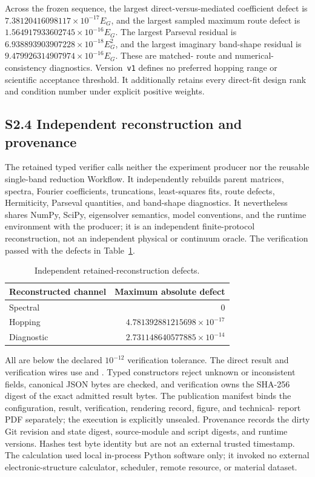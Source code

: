 Across the frozen sequence, the largest direct-versus-mediated coefficient
defect is $7.38120416098117\times10^{-17}E_G$, and the largest sampled maximum
route defect is $1.564917933602745\times10^{-16}E_G$. The largest Parseval
residual is $6.938893903907228\times10^{-18}E_G^2$, and the largest imaginary
band-shape residual is $9.479926314907974\times10^{-16}E_G$. These are matched-
route and numerical-consistency diagnostics. Version~\texttt{v1} defines no preferred
hopping range or scientific acceptance threshold. It additionally retains every
direct-fit design rank and condition number under explicit positive weights.

\subsection*{S2.4 Independent reconstruction and provenance}

The retained typed verifier calls neither the experiment producer nor the reusable
single-band reduction Workflow. It independently rebuilds
parent matrices, spectra, Fourier coefficients, truncations, least-squares
fits, route defects, Hermiticity, Parseval quantities, and band-shape
diagnostics. It nevertheless shares NumPy, SciPy, eigensolver semantics,
model conventions, and the runtime environment with the producer; it is an
independent finite-protocol reconstruction, not an independent physical or
continuum oracle. The verification passed with the defects in
Table~\ref{tab:supp-m1-verification}.

\begin{table}[ht]
\centering
\caption{Independent retained-reconstruction defects.}
\label{tab:supp-m1-verification}
\begin{tabular}{@{}lr@{}}
\toprule
Reconstructed channel & Maximum absolute defect \\
\midrule
Spectral & $0$ \\
Hopping & $4.781392881215698\times10^{-17}$ \\
Diagnostic & $2.731148640577885\times10^{-14}$ \\
\bottomrule
\end{tabular}
\end{table}

All are below the declared $10^{-12}$ verification tolerance. The direct result and
verification wires use
 and
. Typed constructors reject
unknown or inconsistent fields, canonical JSON bytes are checked, and verification
owns the SHA-256 digest of the exact admitted result bytes. The publication manifest
binds the configuration, result, verification, rendering record, figure, and technical-
report PDF separately; the execution is explicitly unsealed. Provenance records the
dirty Git revision and state digest, source-module and script digests, and runtime
versions. Hashes test byte identity but are not an external
trusted timestamp. The calculation used local in-process Python software only; it
invoked no external electronic-structure calculator, scheduler, remote resource, or
material dataset.
